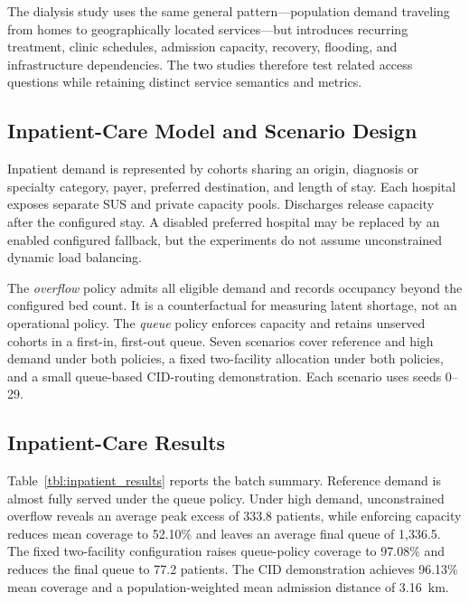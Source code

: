\documentclass[pdflatex,sn-mathphys-num]{sn-jnl}%
\theoremstyle{thmstyleone}%
\theoremstyle{thmstyletwo}%
\theoremstyle{thmstylethree}%
\begin{document}
The dialysis study uses the same general pattern---population demand traveling from homes to geographically located services---but introduces recurring treatment, clinic schedules, admission capacity, recovery, flooding, and infrastructure dependencies. The two studies therefore test related access questions while retaining distinct service semantics and metrics.

\subsection{Inpatient-Care Model and Scenario Design}

Inpatient demand is represented by cohorts sharing an origin, diagnosis or specialty category, payer, preferred destination, and length of stay. Each hospital exposes separate SUS and private capacity pools. Discharges release capacity after the configured stay. A disabled preferred hospital may be replaced by an enabled configured fallback, but the experiments do not assume unconstrained dynamic load balancing.

The \textit{overflow} policy admits all eligible demand and records occupancy beyond the configured bed count. It is a counterfactual for measuring latent shortage, not an operational policy. The \textit{queue} policy enforces capacity and retains unserved cohorts in a first-in, first-out queue. Seven scenarios cover reference and high demand under both policies, a fixed two-facility allocation under both policies, and a small queue-based CID-routing demonstration. Each scenario uses seeds 0--29.

\subsection{Inpatient-Care Results}

Table~\ref{tbl:inpatient_results} reports the batch summary. Reference demand is almost fully served under the queue policy. Under high demand, unconstrained overflow reveals an average peak excess of 333.8 patients, while enforcing capacity reduces mean coverage to 52.10\% and leaves an average final queue of 1,336.5. The fixed two-facility configuration raises queue-policy coverage to 97.08\% and reduces the final queue to 77.2 patients. The CID demonstration achieves 96.13\% mean coverage and a population-weighted mean admission distance of 3.16~km.
\end{document}
